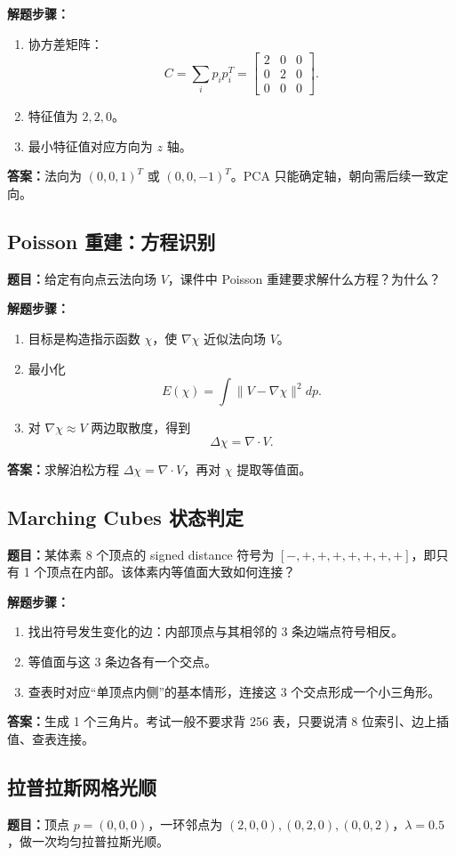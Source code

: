 \documentclass[UTF8,zihao=-4,scheme=chinese,fontset=fandol]{ctexart}
\begin{document}
\textbf{解题步骤：}
\begin{enumerate}
  \item 协方差矩阵：
  \[
  C=\sum_i p_ip_i^T=
  \begin{bmatrix}2&0&0\\0&2&0\\0&0&0\end{bmatrix}.
  \]
  \item 特征值为 $2,2,0$。
  \item 最小特征值对应方向为 $z$ 轴。
\end{enumerate}
\textbf{答案：}法向为 $(0,0,1)^T$ 或 $(0,0,-1)^T$。PCA 只能确定轴，朝向需后续一致定向。

\subsection{Poisson 重建：方程识别}
\textbf{题目：}给定有向点云法向场 $V$，课件中 Poisson 重建要求解什么方程？为什么？

\textbf{解题步骤：}
\begin{enumerate}
  \item 目标是构造指示函数 $\chi$，使 $\nabla\chi$ 近似法向场 $V$。
  \item 最小化
  \[
  E(\chi)=\int\|V-\nabla\chi\|^2dp.
  \]
  \item 对 $\nabla\chi\approx V$ 两边取散度，得到
  \[
  \Delta\chi=\nabla\cdot V.
  \]
\end{enumerate}
\textbf{答案：}求解泊松方程 $\Delta\chi=\nabla\cdot V$，再对 $\chi$ 提取等值面。

\subsection{Marching Cubes 状态判定}
\textbf{题目：}某体素 8 个顶点的 signed distance 符号为 $[-,+,+,+,+,+,+,+]$，即只有 1 个顶点在内部。该体素内等值面大致如何连接？

\textbf{解题步骤：}
\begin{enumerate}
  \item 找出符号发生变化的边：内部顶点与其相邻的 3 条边端点符号相反。
  \item 等值面与这 3 条边各有一个交点。
  \item 查表时对应“单顶点内侧”的基本情形，连接这 3 个交点形成一个小三角形。
\end{enumerate}
\textbf{答案：}生成 1 个三角片。考试一般不要求背 256 表，只要说清 8 位索引、边上插值、查表连接。

\subsection{拉普拉斯网格光顺}
\textbf{题目：}顶点 $p=(0,0,0)$，一环邻点为 $(2,0,0),(0,2,0),(0,0,2)$，$\lambda=0.5$，做一次均匀拉普拉斯光顺。
\end{document}
